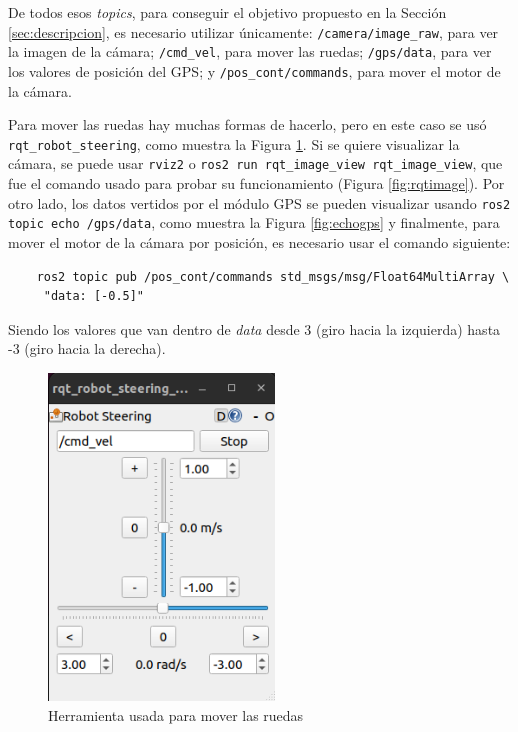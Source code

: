 De todos esos \textit{topics}, para conseguir el objetivo propuesto en la Sección \ref{sec:descripcion}, es necesario utilizar únicamente: \verb|/camera/image_raw|, para ver la imagen de la cámara; \verb|/cmd_vel|, para mover las ruedas; \verb|/gps/data|, para ver los valores de posición del \acs{GPS}; y \verb|/pos_cont/commands|, para mover el motor de la cámara.

Para mover las ruedas hay muchas formas de hacerlo, pero en este caso se usó \verb|rqt_robot_steering|, como muestra la Figura \ref{fig:steering}. Si se quiere visualizar la cámara, se puede usar \verb|rviz2| o \verb|ros2 run rqt_image_view rqt_image_view|, que fue el comando usado para probar su funcionamiento (Figura \ref{fig:rqtimage}). Por otro lado, los datos vertidos por el módulo \acs{GPS} se pueden visualizar usando \verb|ros2 topic echo /gps/data|, como muestra la Figura \ref{fig:echogps} y finalmente, para mover el motor de la cámara por posición, es necesario usar el comando siguiente: 

\begin{verbatim}
	ros2 topic pub /pos_cont/commands std_msgs/msg/Float64MultiArray \
	 "data: [-0.5]"
\end{verbatim} 

Siendo los valores que van dentro de \textit{data} desde 3 (giro hacia la izquierda) hasta -3 (giro hacia la derecha). 

 \begin{figure} [h!]
	\begin{center}
		\includegraphics[width=6cm]{figs/cap6/steering.png}
	\end{center}
	\caption{Herramienta usada para mover las ruedas}
	\label{fig:steering}
\end{figure}

